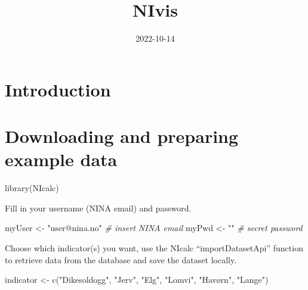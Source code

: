 \documentclass[
]{book}
\title{NIvis}
\author{}
\date{\vspace{-2.5em}2022-10-14}
\newenvironment{Shaded}{\begin{snugshade}}{\end{snugshade}}
\newcommand{\CommentTok}[1]{\textcolor[rgb]{0.56,0.35,0.01}{\textit{#1}}}
\newcommand{\FunctionTok}[1]{\textcolor[rgb]{0.00,0.00,0.00}{#1}}
\newcommand{\NormalTok}[1]{#1}
\newcommand{\OtherTok}[1]{\textcolor[rgb]{0.56,0.35,0.01}{#1}}
\newcommand{\StringTok}[1]{\textcolor[rgb]{0.31,0.60,0.02}{#1}}
\begin{document}
\maketitle

{
\setcounter{tocdepth}{1}
\tableofcontents
}
\hypertarget{introduction}{%
\chapter{Introduction}\label{introduction}}

\hypertarget{downloading-and-preparing-example-data}{%
\chapter{Downloading and preparing example data}\label{downloading-and-preparing-example-data}}

\begin{Shaded}
\begin{Highlighting}[]
\FunctionTok{library}\NormalTok{(NIcalc)}
\end{Highlighting}
\end{Shaded}

Fill in your username (NINA email) and password.

\begin{Shaded}
\begin{Highlighting}[]

\NormalTok{myUser }\OtherTok{\textless{}{-}} \StringTok{"user@nina.no"} \CommentTok{\# insert NINA email}
\NormalTok{myPwd  }\OtherTok{\textless{}{-}} \StringTok{""} \CommentTok{\# secret password}
\end{Highlighting}
\end{Shaded}

Choose which indicator(s) you want, use the NIcalc ``importDatasetApi'' function to retrieve data from the database and save the dataset locally.

\begin{Shaded}
\begin{Highlighting}[]
\NormalTok{indicator }\OtherTok{\textless{}{-}} \FunctionTok{c}\NormalTok{(}\StringTok{"Dikesoldogg"}\NormalTok{,}
               \StringTok{"Jerv"}\NormalTok{,}
               \StringTok{"Elg"}\NormalTok{,}
               \StringTok{"Lomvi"}\NormalTok{,}
               \StringTok{"Havørn"}\NormalTok{,}
               \StringTok{"Lange"}\NormalTok{)}
\end{Highlighting}
\end{Shaded}
\end{document}
